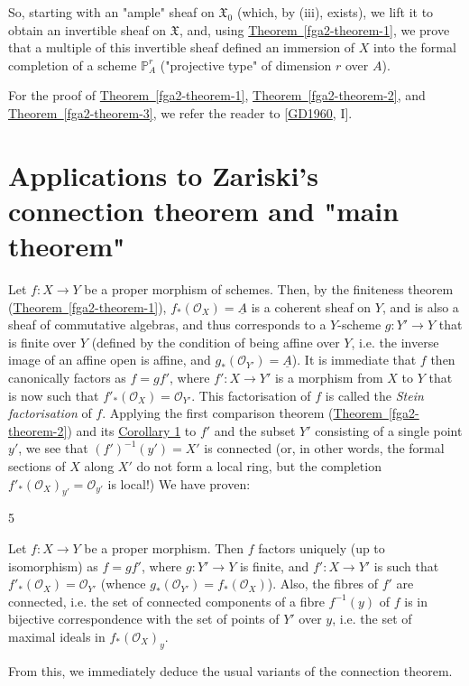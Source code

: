   So, starting with an "ample" sheaf on \(\mathfrak {X}_0\) (which, by (iii), exists), we lift it to obtain an invertible sheaf on \(\mathfrak {X}\), and, using \hyperref[fga2-theorem-1]{Theorem~\ref*{fga2-theorem-1}}, we prove that a multiple of this invertible sheaf defined an immersion of \(X\) into the formal completion of a scheme \(\mathbb {P}_A^r\) ("projective type" of dimension \(r\) over \(A\)).\par{}For the proof of \hyperref[fga2-theorem-1]{Theorem~\ref*{fga2-theorem-1}}, \hyperref[fga2-theorem-2]{Theorem~\ref*{fga2-theorem-2}}, and \hyperref[fga2-theorem-3]{Theorem~\ref*{fga2-theorem-3}}, we refer the reader to [\hyperref[GD1960]{GD1960}, I].\chapter{Applications to Zariski’s connection theorem and "main theorem"}\thispagestyle{fancy}\label{fga2-4}\par{}Let \(f\colon  X\to  Y\) be a proper morphism of schemes.
  Then, by the finiteness theorem (\hyperref[fga2-theorem-1]{Theorem~\ref*{fga2-theorem-1}}), \(f_*(\mathcal {O}_X)=\underline {A}\) is a coherent sheaf on \(Y\), and is also a sheaf of commutative algebras, and thus corresponds to a \(Y\)-scheme \(g\colon  Y'\to  Y\) that is finite over \(Y\) (defined by the condition of being affine over \(Y\), i.e. the inverse image of an affine open is affine, and \(g_*(\mathcal {O}_{Y'})=\underline {A}\)).
  It is immediate that \(f\) then canonically factors as \(f=gf'\), where \(f'\colon  X\to  Y'\) is a morphism from \(X\) to \(Y\) that is now such that \(f'_*(\mathcal {O}_X)=\mathcal {O}_{Y'}\).
  This factorisation of \(f\) is called the \emph{Stein factorisation} of \(f\).
  Applying the first comparison theorem (\hyperref[fga2-theorem-2]{Theorem~\ref*{fga2-theorem-2}}) and its \hyperref[fga2-theorem-2-corollary-1]{Corollary 1} to \(f'\) and the subset \(Y'\) consisting of a single point \(y'\), we see that \((f')^{-1}(y')=X'\) is connected (or, in other words, the formal sections of \(X\) along \(X'\) do not form a local ring, but the completion \(f'_*(\mathcal {O}_X)_{y'}=\mathcal {O}_{y'}\) is local!)
  We have proven:\begin{theorem}{5}\label{fga2-theorem-5}\skipsinglepar\par{}Let \(f\colon  X\to  Y\) be a proper morphism.
    Then \(f\) factors uniquely (up to isomorphism) as \(f=gf'\), where \(g\colon  Y'\to  Y\) is finite, and \(f'\colon  X\to  Y'\) is such that \(f'_*(\mathcal {O}_X)=\mathcal {O}_{Y'}\) (whence \(g_*(\mathcal {O}_{Y'})=f_*(\mathcal {O}_X)\)).
    Also, the fibres of \(f'\) are connected, i.e. the set of connected components of a fibre \(f^{-1}(y)\) of \(f\) is in bijective correspondence with the set of points of \(Y'\) over \(y\), i.e. the set of maximal ideals in \(f_*(\mathcal {O}_X)_y\).\end{theorem}\par{}From this, we immediately deduce the usual variants of the connection theorem.
